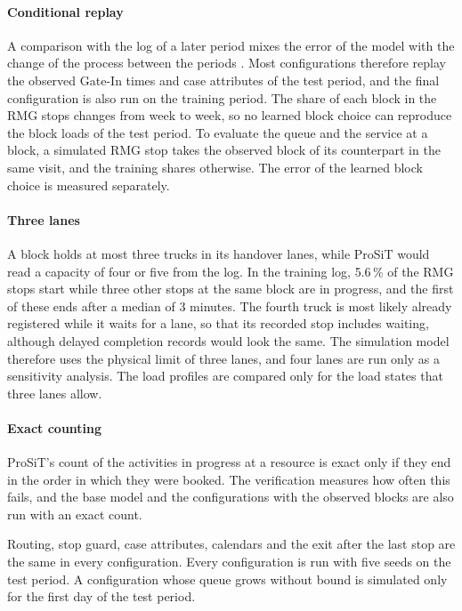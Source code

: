 \paragraph{Conditional replay} A comparison with the log of a later period mixes the
error of the model with the change of the process between the periods
\cite{Oezdemir2025RethinkingBPS}. Most configurations therefore replay the observed
Gate-In times and case attributes of the test period, and the final configuration is
also run on the training period. The share of each block in the RMG stops changes
from week to week, so no learned block choice can reproduce the block loads of the
test period. To evaluate the queue and the service at a block, a simulated RMG stop
takes the observed block of its counterpart in the same visit, and the training
shares otherwise. The error of the learned block choice is measured separately.

\paragraph{Three lanes} A block holds at most three trucks in its handover lanes,
while ProSiT would read a capacity of four or five from the log. In the training log,
5.6\,\% of the RMG stops start while three other stops at the same block are in
progress, and the first of these ends after a median of 3 minutes. The fourth truck
is most likely already registered while it waits for a lane, so that its recorded
stop includes waiting, although delayed completion records would look the same. The
simulation model therefore uses the physical limit of three lanes, and four lanes are
run only as a sensitivity analysis. The load profiles are compared only for the load
states that three lanes allow.

\paragraph{Exact counting} ProSiT's count of the activities in progress at a resource
is exact only if they end in the order in which they were booked. The verification
measures how often this fails, and the base model and the configurations with the
observed blocks are also run with an exact count.

Routing, stop guard, case attributes, calendars and the exit after the last stop are
the same in every configuration. Every configuration is run with five seeds on the
test period. A configuration whose queue grows without bound is simulated only for
the first day of the test period.

